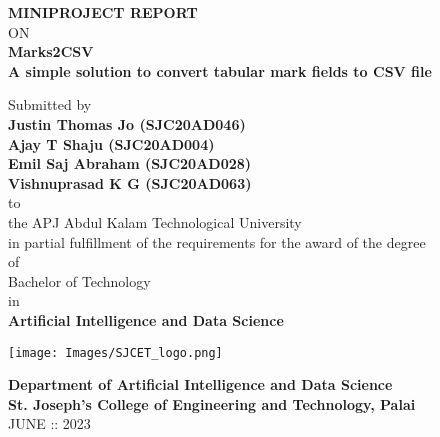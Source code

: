 \thispagestyle{empty}
\begin{center}
 
{\normalsize \bf MINIPROJECT REPORT}\\
ON\\
\vspace*{0.2 cm}
{\huge \bf Marks2CSV}\\
{\normalsize \bf A simple solution to convert tabular mark fields to CSV file}

   \vspace{0.5 cm}
   \large Submitted by\\
   { \bf Justin Thomas Jo (SJC20AD046)}\\
   { \bf Ajay T Shaju (SJC20AD004)}\\
   { \bf Emil Saj Abraham (SJC20AD028)}\\
   { \bf Vishnuprasad K G (SJC20AD063)}\\[-0.6mm]
  {\large to\\[-0.6mm] the APJ Abdul Kalam Technological University\\[-0.6mm] in partial fulfillment of the requirements for the award of the degree\\[-0.6mm] of\\[-0.6mm] Bachelor of Technology\\[-0.6mm] in\\[-0.6mm] {\bf Artificial Intelligence and Data Science}}
  
   \begin{center}
   \texttt{[image: Images/SJCET\_logo.png]}
   \end{center}
   \vspace*{-0.5cm}
  {\LARGE {\bf Department of Artificial Intelligence and Data Science}}\\
          [-3mm] {\large {\bf St. Joseph's College of Engineering and Technology, Palai}\\
           [1mm] JUNE :: 2023}

\end{center}


\newpage

